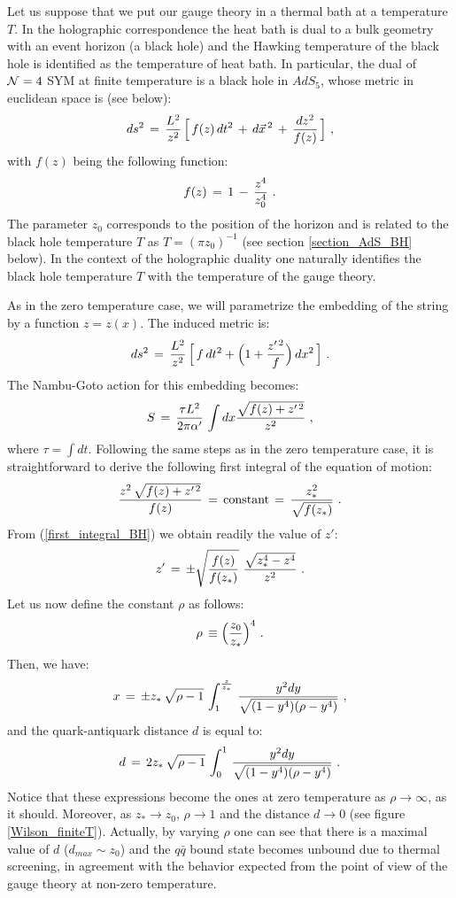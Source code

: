 \documentclass[12pt,notitlepage]{article}
\newcommand{\beq}{\begin{equation}}
\newcommand{\eeq}{\end{equation}}
\begin{document}
Let us suppose that we put our gauge theory in a thermal bath at a temperature $T$. In the holographic correspondence the heat bath is dual to a bulk geometry with an event horizon (a black hole) and the Hawking temperature of the black hole is identified as the temperature of heat bath.  In particular, the dual of ${\cal N}=4$ SYM at finite temperature is a black hole in $AdS_5$, whose metric  in euclidean space is (see below):
\beq
ds^2\,=\,{L^2\over z^2}\,\Big[\,f(z)\,dt^2\,+\,d\vec x^{\,2}\,+\,{dz^2\over f(z)}\,\Big]\,\,,
\eeq
 with $f(z)$ being the following function:
 \beq
 f(z)\,=\,1\,-\,{z^4\over z_0^4}\,\,.
 \eeq
The parameter $z_0$ corresponds to the position of the horizon and is related to the black hole temperature $T$ as $T=(\pi z_0)^{-1}$ (see section \ref{section_AdS_BH} below).  In the context of the holographic duality one naturally identifies the black hole temperature $T$ with the temperature of the gauge theory.  




As in the zero temperature case, we will parametrize the embedding of the string by a function $z=z(x)$. The induced metric is:
\beq
ds^2\,=\, {L^2\over z^2}\,\Big[\,f\,dt^2+\Big(1+{z'^{\,2}\over f}\Big)\,dx^2\,\Big]\,\,.
\eeq
The Nambu-Goto action for this embedding becomes:
\beq
S\,=\,{\tau L^2\over 2\pi\alpha'}\,\int dx 
{\sqrt{f(z)+z'^{\,2}}\over z^2}\,\,,
\eeq
where $\tau=\int dt$. Following the same steps as in the zero temperature case, it is straightforward to derive the following first integral of the equation of motion:
\beq
{z^2\,\sqrt{f(z)+z'^{\,2}}\over f(z)}\,=\,{\rm constant}\,=\,{z_*^2\over \sqrt{f(z_*)}}\,\,.
\label{first_integral_BH}
\eeq
From (\ref{first_integral_BH}) we obtain readily the value of $z'$:
\beq
z'\,=\,\pm \sqrt{{f(z)\over f(z_*)}}\,\,
{\sqrt{z_*^4-z^4}\over z^2}\,\,.
\eeq
Let us now define the constant $\rho$ as follows:
\beq
\rho\,\equiv \Big({z_0\over z_*}\Big)^4\,\,.
\label{rho_def}
\eeq
Then, we have:
\beq
x\,=\,\pm z_*\,\sqrt{\rho-1}\,
\int_{1}^{{z\over z_*}}\,
{y^2 dy\over \sqrt{(1-y^4)(\rho-y^4)}}\,\,,
\eeq
and the quark-antiquark distance $d$ is equal to:
\beq
d\,=\,2 z_*\,\sqrt{\rho-1}\,
\int_{0}^{1}\,
{y^2 dy\over \sqrt{(1-y^4)(\rho-y^4)}}\,\,.
\eeq
Notice that these expressions become the ones at zero temperature as $\rho\to\infty$, as it should. Moreover, as  $z_*\to z_0$, $\rho\to 1$ and  the distance $d\to 0$ (see figure \ref{Wilson_finiteT}). Actually, by varying $\rho$ one can see that there is a maximal value of $d$ ($d_{max}\sim z_0$) and the $q\bar q$ bound state becomes unbound due to thermal screening, in agreement with the behavior expected from the point of view of the gauge theory at non-zero temperature. 
\end{document}
